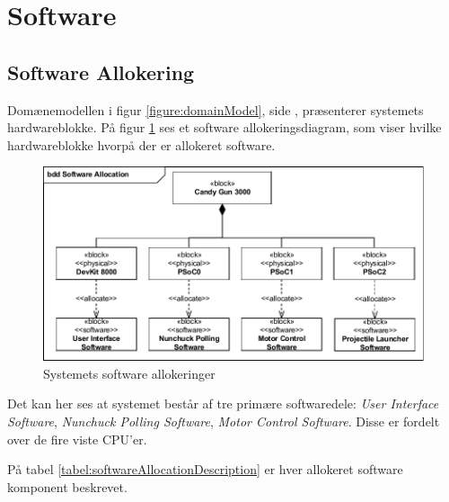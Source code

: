 \section{Software}

\subsection{Software Allokering}
\label{afsnit:SoftwareAllokering}

Domænemodellen i figur \ref{figure:domainModel}, side \pageref{figure:domainModel}, præsenterer systemets hardwareblokke. På figur \ref{figure:allocationDiagram} ses et software allokeringsdiagram, som viser hvilke hardwareblokke hvorpå der er allokeret software. 

\begin{figure}[H]
	\centering
	\includegraphics[width=\textwidth]{SystemArkitektur/images/SoftwareAllocation}
	\caption{Systemets software allokeringer}
	\label{figure:allocationDiagram}
\end{figure}

\noindent Det kan her ses at systemet består af tre primære softwaredele: \textit{User Interface Software}, \textit{Nunchuck Polling Software}, \textit{Motor Control Software}. Disse er fordelt over de fire viste CPU'er.\newline

\noindent På tabel \ref{tabel:softwareAllocationDescription} er hver allokeret software komponent beskrevet.

